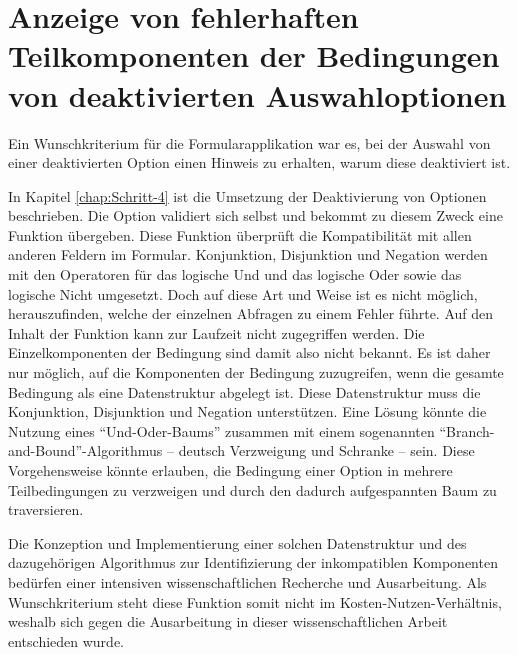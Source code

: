 \section{Anzeige von fehlerhaften Teilkomponenten der Bedingungen von deaktivierten Auswahloptionen}
\label{sec:Anzeige-von-fehlerhaften-Teilkomponenten-der-Bedingungen-von-deaktivierten-Auswahloptionen}


Ein Wunschkriterium für die Formularapplikation war es,
bei der Auswahl von einer deaktivierten Option einen Hinweis zu erhalten,
warum diese deaktiviert ist.

In Kapitel \ref{chap:Schritt-4} ist die Umsetzung der Deaktivierung von Optionen beschrieben.
Die Option validiert sich selbst und bekommt zu diesem Zweck eine Funktion übergeben. Diese Funktion überprüft die Kompatibilität mit allen anderen Feldern im Formular.
Konjunktion, Disjunktion und Negation werden mit den Operatoren für das logische Und und das logische Oder sowie das logische Nicht umgesetzt.
Doch auf diese Art und Weise ist es nicht möglich,
herauszufinden,
welche der einzelnen Abfragen zu einem Fehler führte.
Auf den Inhalt der Funktion kann zur Laufzeit nicht zugegriffen werden.
Die Einzelkomponenten der Bedingung sind damit also nicht bekannt. 
Es ist daher nur möglich,
auf die Komponenten der Bedingung zuzugreifen,
wenn die gesamte Bedingung als eine Datenstruktur abgelegt ist.
Diese Datenstruktur muss die Konjunktion, Disjunktion und Negation unterstützen.
Eine Lösung könnte die Nutzung eines \enquote{Und-Oder-Baums} zusammen mit einem sogenannten \enquote{Branch-and-Bound}-Algorithmus -- deutsch Verzweigung und Schranke -- sein.
Diese Vorgehensweise könnte erlauben, die Bedingung einer Option in mehrere Teilbedingungen zu verzweigen und durch den dadurch aufgespannten Baum zu traversieren. 


Die Konzeption und Implementierung einer solchen Datenstruktur und des dazugehörigen Algorithmus zur Identifizierung der inkompatiblen Komponenten bedürfen einer intensiven wissenschaftlichen Recherche und Ausarbeitung.
Als Wunschkriterium steht diese Funktion somit nicht im Kosten-Nutzen-Verhältnis, weshalb sich gegen die Ausarbeitung in dieser wissenschaftlichen Arbeit entschieden wurde.

